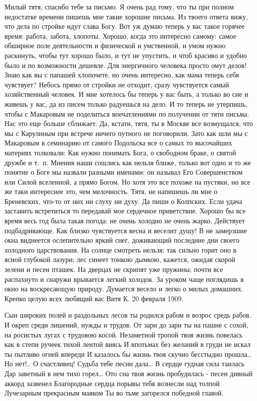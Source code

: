\documentclass[]{memoir}
\begin{document}


Милый тятя, спасибо тебе  за письмо. Я очень рад тому, что ты при полном недостатке времени пишешь мне такие хорошие письма. Из твоего ответа вижу, что дела по стройке идут слава Богу. Вот уж думаю теперь у вас такое горячее время: работа, забота, хлопоты. Хорошо, когда это интересно самому: самое обширное поле деятельности и физической и умственной, и умом нужно раскинуть, чтобы тут хорошо было, и тут не упустить, и чтоб красиво и удобно было и по возможности дешевле. Для энергичного человека просто омут делов! Знаю как вы с папашей хлопочете, но очень интересно, как мама теперь себя чувствует? Небось прямо от стройки не отходит, сразу чувствуется самый хозяйственный человек. И мне хотелось бы теперь у вас быть, а только во сне и живешь у вас, да из писем только радуешься на дело.  И то теперь не утерпишь, чтобы с Макаровым не поделиться впечатлениями по получении от тяти письма. Нас это еще больше сближает. Да, кстати, тятя, ты в Москве все возмущался, что мы с Карулиным при встрече ничего путного не поговорили. Зато как шли мы с Макаровым в семинарию от самого Подольска все о самых то высочайших материях толковали: Как нужно понимать Бога, о свободном браке, о святой дружбе и т. п. Мнения наши сошлись как нельзя ближе, только вот одно  и то же  понятие о Боге мы назвали разными именами: он называл Его Совершенством или Силой вселенной, а прямо Богом. Но хотя это все похоже на пустяки, но все же таки интереснее это, чем мелочность. 
Тятя, не напишешь ли мне о Бреневских, что-то от них ни слуху ни духу. Да пиши о Колпских. Если удача заставить встретиться  то передавай мое сердечное приветствие. 
Хорошо бы все время весь год была такая погода: не очень холодно не очень жарко. Действует подбадривающе.  Как близко чувствуется весна и веселит душу! В не замерзшие окна виднеется ослепительно яркий снег, доживающий последние дни своего холодного царствования. На солнце смотреть нельзя: так сильно горит оно в ясной глубокой лазури; лес синеет тонкою дымкою, кажется, ожидая скорой зелени и песен пташек. На дверцах не скрипят уже  пружины; почти все распахнуто и снаружи врывается легкий холодок. За уроком чаще поглядишь в окно на воскресающую природу. Думается весело и легко о милых домашних. Крепко целую всех любящий вас Витя К. 
20 февраля 1909.

Сын широких полей и раздольных лесов ты родился рабом и возрос средь рабов. И окреп среди лишений, нужды и трудов.
От зари до зари ты на пашне с сохой, на росистых лугах с трудовою косой. 
Незаметной тропой твоя жизнь повелась как в степи ручеек тихой лентой виясь
И впотьмах без желаний в груди не искал ты пытливо огней впереди
И казалось бы жизнь твоя скучно бесстыдно прошла…
Но нет!..  О счастливец! Судьба тебе песни дала…
В сердце гудная сила таилась Дар заветный в нем тихо горел… Ото сна твоя жизнь пробудилась -  песен дивный аккорд зазвенел
Благородные сердца порывы тебя вознесли над толпой Лучезарным прекрасным маяком
Ты во тьме загорелся победной главой. 
\end{document}
